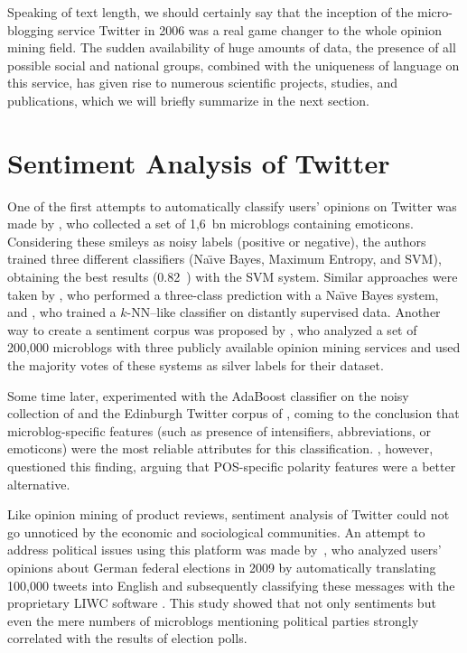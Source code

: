 
Speaking of text length, we should certainly say that the inception of
the micro-blogging service Twitter in 2006 was a real game changer to
the whole opinion mining field.  The sudden availability of huge
amounts of data, the presence of all possible social and national
groups, combined with the uniqueness of language on this service, has
given rise to numerous scientific projects, studies, and publications,
which we will briefly summarize in the next section.

\section{Sentiment Analysis of Twitter}\label{snt:subsec:intro:saot}

One of the first attempts to automatically classify users' opinions on
Twitter was made by \citet{Go:09}, who collected a set of 1,6~bn
microblogs containing emoticons.  Considering these smileys as noisy
labels (positive or negative), the authors trained three different
classifiers (Na\"{\i}ve Bayes, Maximum Entropy, and SVM), obtaining
the best results (0.82~\F{}) with the SVM system.  Similar approaches
were taken by \citet{Pak:10}, who performed a three-class prediction
with a Na\"{\i}ve Bayes system, and \citet{Davidov:10}, who trained a
$k$-NN--like classifier on distantly supervised data. Another way to
create a sentiment corpus was proposed by \citet{Barbosa:10}, who
analyzed a set of 200,000 microblogs with three publicly available
opinion mining services and used the majority votes of these systems
as silver labels for their dataset.

Some time later, \citet{Kouloumpis:11} experimented with the AdaBoost
classifier on the noisy collection of \citet{Go:09} and the Edinburgh
Twitter corpus of \citet{Petrovic:10}, coming to the conclusion that
microblog-specific features (such as presence of intensifiers,
abbreviations, or emoticons) were the most reliable attributes for
this classification.  \citet{Agarwal:11}, however, questioned this
finding, arguing that POS-specific polarity features were a better
alternative.

Like opinion mining of product reviews, sentiment analysis of Twitter
could not go unnoticed by the economic and sociological communities.
An attempt to address political issues using this platform was made
by~\citet{Tumasjan:10}, who analyzed users' opinions about German
federal elections in 2009 by automatically translating 100,000 tweets
into English and subsequently classifying these messages with the
proprietary LIWC software \cite{Pannebaker:07}.  This study showed
that not only sentiments but even the mere numbers of microblogs
mentioning political parties strongly correlated with the results of
election polls.

